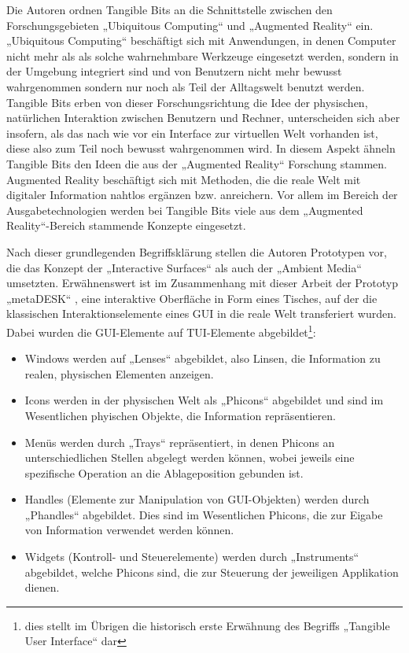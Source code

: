 Die Autoren ordnen Tangible Bits an die Schnittstelle zwischen den Forschungsgebieten „Ubiquitous Computing“ und „Augmented Reality“ ein. „Ubiquitous Computing“ \citep{Weiser91} beschäftigt sich mit Anwendungen, in denen Computer nicht mehr als als solche wahrnehmbare Werkzeuge eingesetzt werden, sondern in der Umgebung integriert sind und von Benutzern nicht mehr bewusst wahrgenommen sondern nur noch als Teil der Alltagswelt benutzt werden. Tangible Bits erben von dieser Forschungsrichtung die Idee der physischen, natürlichen Interaktion zwischen Benutzern und Rechner, unterscheiden sich aber insofern, als das nach wie vor ein Interface zur virtuellen Welt vorhanden ist, diese also zum Teil noch bewusst wahrgenommen wird. In diesem Aspekt ähneln Tangible Bits den Ideen die aus der „Augmented Reality“ Forschung stammen. Augmented Reality beschäftigt sich mit Methoden, die die reale Welt mit digitaler Information nahtlos ergänzen bzw. anreichern. Vor allem im Bereich der Ausgabetechnologien werden bei Tangible Bits viele aus dem „Augmented Reality“-Bereich stammende Konzepte eingesetzt.

Nach dieser grundlegenden Begriffsklärung stellen die Autoren Prototypen vor, die das Konzept der „Interactive Surfaces“ als auch der „Ambient Media“ umsetzten. Erwähnenswert ist im Zusammenhang mit dieser Arbeit der Prototyp „metaDESK“ \citep{Ullmer97}, eine interaktive Oberfläche in Form eines Tisches, auf der die klassischen Interaktionselemente eines \gls{GUI} in die reale Welt transferiert wurden. Dabei wurden die \gls{GUI}-Elemente auf \gls{TUI}-Elemente abgebildet\footnote{dies stellt im Übrigen die historisch erste Erwähnung des Begriffs „Tangible User Interface“ dar}: 
\begin{itemize}
	\item Windows werden auf „Lenses“ abgebildet, also Linsen, die Information zu realen, physischen Elementen anzeigen.
	\item Icons werden in der physischen Welt als „Phicons“ abgebildet und sind im Wesentlichen phyischen Objekte, die Information repräsentieren.
	\item Menüs werden durch „Trays“ repräsentiert, in denen Phicons an unterschiedlichen Stellen abgelegt werden können, wobei jeweils eine spezifische Operation an die Ablageposition gebunden ist. 
	\item Handles (Elemente zur Manipulation von GUI-Objekten) werden durch „Phandles“ abgebildet. Dies sind im Wesentlichen Phicons, die zur Eigabe von Information verwendet werden können.
	\item Widgets (Kontroll- und Steuerelemente) werden durch „Instruments“ abgebildet, welche Phicons sind, die zur Steuerung der jeweiligen Applikation dienen.
\end{itemize}

